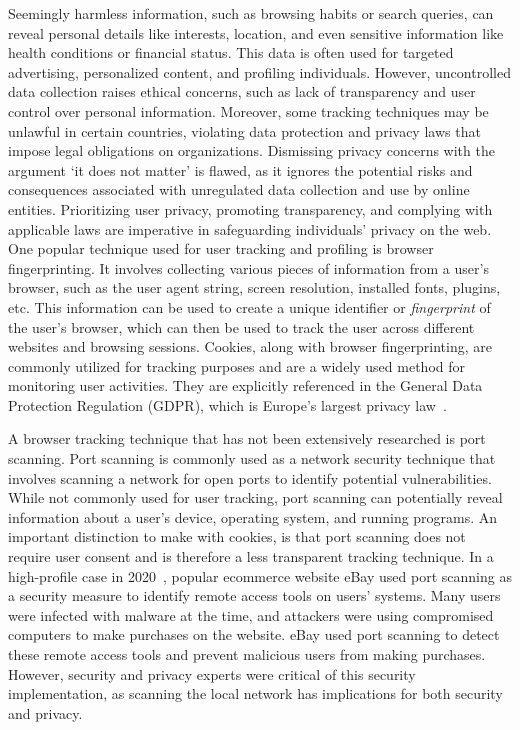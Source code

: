 Seemingly harmless information, such as browsing habits or search queries, can reveal personal details like interests, location, and even sensitive information like health conditions or financial status. This data is often used for targeted advertising, personalized content, and profiling individuals. However, uncontrolled data collection raises ethical concerns, such as lack of transparency and user control over personal information. Moreover, some tracking techniques may be unlawful in certain countries, violating data protection and privacy laws that impose legal obligations on organizations. Dismissing privacy concerns with the argument `it does not matter' is flawed, as it ignores the potential risks and consequences associated with unregulated data collection and use by online entities. Prioritizing user privacy, promoting transparency, and complying with applicable laws are imperative in safeguarding individuals' privacy on the web.
\clearpage
One popular technique used for user tracking and profiling is browser fingerprinting. It involves collecting various pieces of information from a user's browser, such as the user agent string, screen resolution, installed fonts, plugins, etc. This information can be used to create a unique identifier or \emph{fingerprint} of the user's browser, which can then be used to track the user across different websites and browsing sessions. Cookies, along with browser fingerprinting, are commonly utilized for tracking purposes and are a widely used method for monitoring user activities. They are explicitly referenced in the General Data Protection Regulation (GDPR), which is Europe's largest privacy law~.

A browser tracking technique that has not been extensively researched is port scanning. Port scanning is commonly used as a network security technique that involves scanning a network for open ports to identify potential vulnerabilities. While not commonly used for user tracking, port scanning can potentially reveal information about a user's device, operating system, and running programs. An important distinction to make with cookies, is that port scanning does not require user consent and is therefore a less transparent tracking technique.
In a high-profile case in 2020~, popular ecommerce website eBay used port scanning as a security measure to identify remote access tools on users' systems. Many users were infected with malware at the time, and attackers were using compromised computers to make purchases on the website. eBay used port scanning to detect these remote access tools and prevent malicious users from making purchases. However, security and privacy experts were critical of this security implementation, as scanning the local network has implications for both security and privacy.

